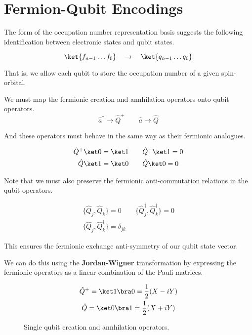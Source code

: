\section{Fermion-Qubit Encodings}
The form of the occupation number representation basis suggests the following identification between electronic states and qubit states.

\begin{equation*}
    \ket{f_{n-1} \dots f_{0}} \quad\rightarrow\quad \ket{q_{n-1} \dots q_{0}}
\end{equation*}

That is, we allow each qubit to store the occupation number of a given spin-orbital.


We must map the fermionic creation and annhilation operators onto qubit operators.
\begin{equation*}
    \hat a^\dagger \rightarrow \hat Q^+ \qquad
    \hat a \rightarrow \hat Q
\end{equation*}

And these operators must behave in the same way as their fermionic analogues.

\begin{equation*}
\begin{gathered}
    \hat Q^+ \ket 0 = \ket 1 \qquad \hat Q^+ \ket 1 = 0 \\
    \hat Q \ket 1 = \ket 0 \qquad \hat Q \ket 0 = 0
\end{gathered}
\end{equation*}

Note that we must also preserve the fermionic anti-commutation relations in the qubit operators.

\begin{equation*}
\begin{gathered}
    \{ \hat Q_{j}, \hat Q_{k} \} = 0 \qquad
    \{ \hat Q_{j}^{\dagger}, \hat Q_{k}^{\dagger} \} = 0 \\
    \{ \hat Q_{j}, \hat Q_{k}^{\dagger} \} = \delta_{jk}
\end{gathered}
\end{equation*}\medskip

This ensures the fermionic exchange anti-symmetry of our qubit state vector.

We can do this using the \textbf{Jordan-Wigner} transformation by expressing the fermionic operators as a linear combination of the Pauli matrices.
\begin{figure}
    \begin{equation*}
    \begin{gathered}
        \hat Q^+ = \ket 1 \bra 0 = \frac{1}{2} (X - iY) \\
        \hat Q = \ket 0 \bra 1 = \frac{1}{2} (X + iY) 
    \end{gathered}
    \end{equation*}
    \caption{Single qubit creation and annhilation operators.}
\end{figure}

